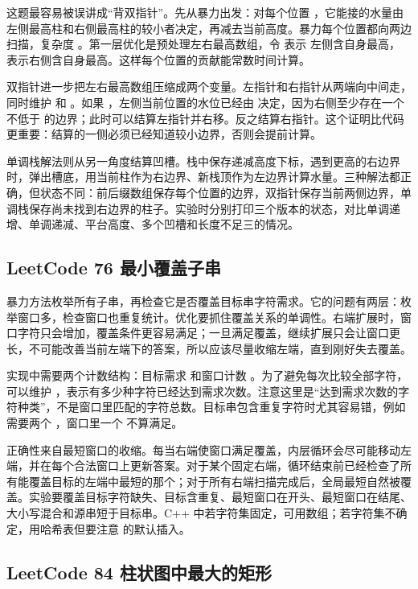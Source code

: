 这题最容易被误讲成“背双指针”。先从暴力出发：对每个位置 ，它能接的水量由左侧最高柱和右侧最高柱的较小者决定，再减去当前高度。暴力每个位置都向两边扫描，复杂度 。第一层优化是预处理左右最高数组，令  表示  左侧含自身最高， 表示右侧含自身最高。这样每个位置的贡献能常数时间计算。

双指针进一步把左右最高数组压缩成两个变量。左指针和右指针从两端向中间走，同时维护  和 。如果 ，左侧当前位置的水位已经由  决定，因为右侧至少存在一个不低于  的边界；此时可以结算左指针并右移。反之结算右指针。这个证明比代码更重要：结算的一侧必须已经知道较小边界，否则会提前计算。

单调栈解法则从另一角度结算凹槽。栈中保存递减高度下标，遇到更高的右边界时，弹出槽底，用当前柱作为右边界、新栈顶作为左边界计算水量。三种解法都正确，但状态不同：前后缀数组保存每个位置的边界，双指针保存当前两侧边界，单调栈保存尚未找到右边界的柱子。实验时分别打印三个版本的状态，对比单调递增、单调递减、平台高度、多个凹槽和长度不足三的情况。

\subsection{LeetCode 76 最小覆盖子串}

暴力方法枚举所有子串，再检查它是否覆盖目标串字符需求。它的问题有两层：枚举窗口多，检查窗口也重复统计。优化要抓住覆盖关系的单调性。右端扩展时，窗口字符只会增加，覆盖条件更容易满足；一旦满足覆盖，继续扩展只会让窗口更长，不可能改善当前左端下的答案，所以应该尽量收缩左端，直到刚好失去覆盖。

实现中需要两个计数结构：目标需求  和窗口计数 。为了避免每次比较全部字符，可以维护 ，表示有多少种字符已经达到需求次数。注意这里是“达到需求次数的字符种类”，不是窗口里匹配的字符总数。目标串包含重复字符时尤其容易错，例如  需要两个 ，窗口里一个  不算满足。

正确性来自最短窗口的收缩。每当右端使窗口满足覆盖，内层循环会尽可能移动左端，并在每个合法窗口上更新答案。对于某个固定右端，循环结束前已经检查了所有能覆盖目标的左端中最短的那个；对于所有右端扫描完成后，全局最短自然被覆盖。实验要覆盖目标字符缺失、目标含重复、最短窗口在开头、最短窗口在结尾、大小写混合和源串短于目标串。C++ 中若字符集固定，可用数组；若字符集不确定，用哈希表但要注意  的默认插入。

\subsection{LeetCode 84 柱状图中最大的矩形}

